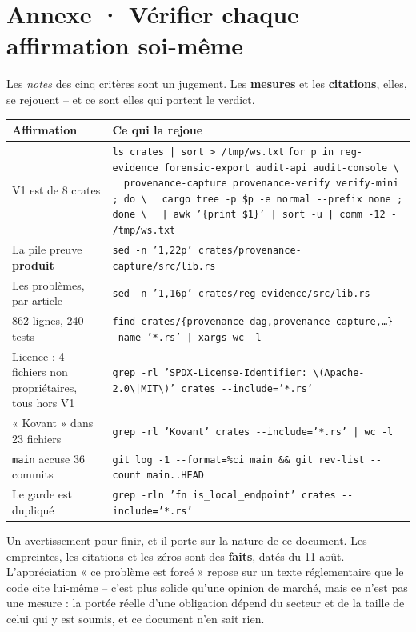 \documentclass[10pt]{article}
\newcommand{\code}[1]{\texttt{\small #1}}
\begin{document}
\section{Annexe · Vérifier chaque affirmation soi-même}

Les \emph{notes} des cinq critères sont un jugement. Les \textbf{mesures} et les \textbf{citations},
elles, se rejouent -- et ce sont elles qui portent le verdict.

\renewcommand{\arraystretch}{1.22}
\begin{center}\small
\begin{tabular}{@{}>{\raggedright\arraybackslash}p{5.3cm} >{\raggedright\arraybackslash}p{10.8cm}@{}}
\toprule
\textbf{Affirmation} & \textbf{Ce qui la rejoue} \\
\midrule
V1 est de 8 crates &
  \code{ls crates | sort > /tmp/ws.txt} \newline
  \code{for p in reg-evidence forensic-export audit-api audit-console \textbackslash} \newline
  \code{\ \ provenance-capture provenance-verify verify-mini ; do \textbackslash} \newline
  \code{\ \ cargo tree -p \$p -e normal -{}-prefix none ; done \textbackslash} \newline
  \code{\ \ | awk '\{print \$1\}' | sort -u | comm -12 - /tmp/ws.txt} \\
La pile preuve \textbf{produit} &
  \code{sed -n '1,22p' crates/provenance-capture/src/lib.rs} \\
Les problèmes, par article &
  \code{sed -n '1,16p' crates/reg-evidence/src/lib.rs} \\
12 862 lignes, 240 tests &
  \code{find crates/\{provenance-dag,provenance-capture,…\} -name '*.rs' | xargs wc -l} \\
Licence : 4 fichiers non propriétaires, tous hors V1 &
  \code{grep -rl 'SPDX-License-Identifier: \textbackslash(Apache-2.0\textbackslash|MIT\textbackslash)' crates -{}-include='*.rs'} \\
« Kovant » dans 23 fichiers &
  \code{grep -rl 'Kovant' crates -{}-include='*.rs' | wc -l} \\
\code{main} accuse 36 commits &
  \code{git log -1 -{}-format=\%ci main \; \&\& \; git rev-list -{}-count main..HEAD} \\
Le garde est dupliqué &
  \code{grep -rln 'fn is\_local\_endpoint' crates -{}-include='*.rs'} \\
\bottomrule
\end{tabular}
\end{center}

Un avertissement pour finir, et il porte sur la nature de ce document. Les empreintes, les citations et
les zéros sont des \textbf{faits}, datés du 11 août. L'appréciation « ce problème est forcé » repose
sur un texte réglementaire que le code cite lui-même -- c'est plus solide qu'une opinion de marché,
mais ce n'est pas une mesure : la portée réelle d'une obligation dépend du secteur et de la taille de
celui qui y est soumis, et ce document n'en sait rien.
\end{document}
